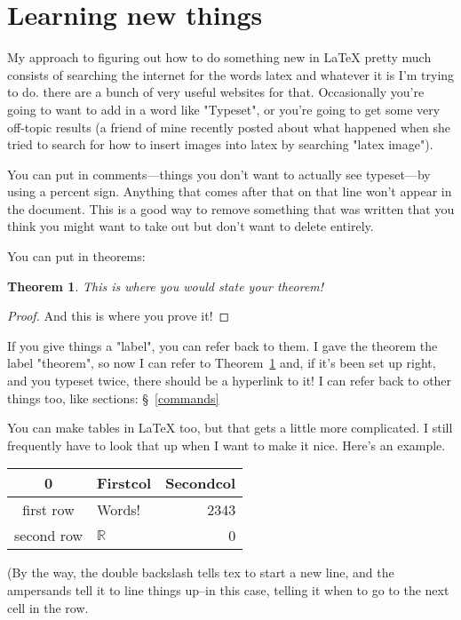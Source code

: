 \documentclass[11pt]{article}
\newcommand{\R}{\ensuremath{\mathbb R}}
\newtheorem{theorem}{Theorem}[section]
\theoremstyle{definition}
\begin{document}
\section{Learning new things}

My approach to figuring out how to do something new in LaTeX pretty much consists of searching the internet for the words latex and whatever it is I'm trying to do. there are a bunch of very useful websites for that. Occasionally you're going to want to add in a word like "Typeset", or you're going to get some very off-topic results (a friend of mine recently posted about what happened when she tried to search for how to insert images into latex by searching "latex image"). 

You can put in comments---things you don't want to actually see typeset---by using a percent sign. Anything that comes after that on that line won't appear in the document. This is a good way to remove something that was written that you think you might want to take out but don't want to delete entirely. 

You can put in theorems:

\begin{theorem}\label{thattheorem} This is where you would state your theorem!
\end{theorem}

\begin{proof}
And this is where you prove it!
\end{proof}

If you give things a "label", you can refer back to them. I gave the theorem the label "theorem", so now I can refer to Theorem~\ref{thattheorem} and, if it's been set up right, and you typeset twice, there should be a hyperlink to it! I can refer back to other things too, like sections: \S~\ref{commands}

You can make tables in LaTeX too, but that gets a little more complicated. I still frequently have to look that up when I want to make it nice. Here's an example. 

\begin{tabular}{|c|l|r|}
\hline 0 & Firstcol & Secondcol \\ \hline 
first row & Words! & 2343 \\\hline second row & $\R$ & 0 \\\hline \end{tabular}

(By the way, the double backslash tells tex to start a new line, and the ampersands tell it to line things up--in this case, telling it when to go to the next cell in the row. 
\end{document}
